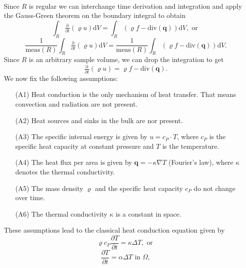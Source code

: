 \documentclass[a4paper,11pt]{article}
\begin{document}
\\
Since $R$ is regular we can interchange time derivation and integration and apply the Gauss-Green theorem on the boundary integral to obtain
\begin{equation*}
\int_R \tfrac{\mathrm{\partial}}{\partial t}  \left( \varrho u \right) \mathrm{d} V = \int_R \left( \varrho f  -  \mathrm{div}(\boldsymbol{q}) \right) \mathrm{d} V , \text{ or }
\end{equation*}
\begin{equation*}
\frac{1}{\mathrm{meas}(R)}\int_R \tfrac{\mathrm{\partial}}{\partial t}  \left( \varrho u \right) \mathrm{d} V = \frac{1}{\mathrm{meas}(R)} \int_R \left( \varrho f  -  \mathrm{div}(\boldsymbol{q}) \right) \mathrm{d} V.
\end{equation*}
Since $R$ is an arbitrary sample volume, we can drop the integration to get
\begin{equation*}
\tfrac{\mathrm{\partial}}{\partial t}  \left( \varrho u \right) = \varrho f  -  \mathrm{div}(\boldsymbol{q}) .
\end{equation*}
We now fix the following assumptions:
\begin{enumerate}
\item[(A1)] Heat conduction is the only mechanism of heat transfer. That means convection and radiation are not present.
\item[(A2)] Heat sources and sinks in the bulk are nor present.
\item[(A3)] The specific internal energy is given by $u = c_P \cdot T $, where $c_P$ is the specific heat capacity at constant pressure and $T$ is the temperature.
\item[(A4)] The heat flux per area is given by $ \boldsymbol{q} = - \kappa \nabla T $ (Fourier's law), where $\kappa $ denotes the thermal conductivity.
\item[(A5)] The mass density $\varrho $ and the specific heat capacity $c_P$ do not change over time.
\item[(A6)] The thermal conductivity $\kappa $ is a constant in space.
\end{enumerate}
These assumptions lead to the classical heat conduction equation given by
\begin{equation}
\varrho c_P \frac{\partial T}{\partial t} = \kappa \Delta T , \text{ or }
\end{equation}
\begin{equation}
\frac{\partial T}{\partial t} = \alpha \Delta T \text{ in } \Omega ,
\end{equation}
\end{document}
